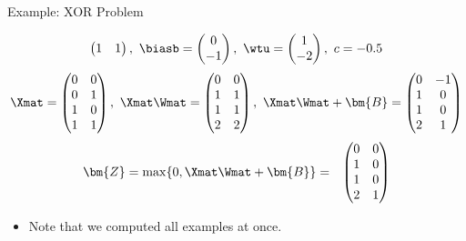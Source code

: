 \documentclass[11pt,compress,t,notes=noshow, xcolor=table]{beamer}
\begin{document}
\begin{vbframe}{Example: XOR Problem}
{\begin{eqnarray*}
\begin{pmatrix}
      1 & 1
    \end{pmatrix}, \
      \biasb = \begin{pmatrix}
      0 \\
      -1
    \end{pmatrix}, \
      \wtu = \begin{pmatrix}
      1 \\
      -2
    \end{pmatrix}, \
      c = - 0.5
  \end{eqnarray*}
  \begin{eqnarray*}
  \Xmat = \begin{pmatrix}
      0 & 0 \\
      0 & 1 \\
      1 & 0 \\
      1 & 1
    \end{pmatrix}, \
    \Xmat\Wmat = \begin{pmatrix}
      0 & 0 \\
      1 & 1 \\
      1 & 1 \\
      2 & 2
    \end{pmatrix}, \
      \Xmat \Wmat + \bm{B} = \begin{pmatrix}
        0 & -1 \\
        1 & 0 \\
        1 & 0 \\
        2 & 1
    \end{pmatrix}
  \end{eqnarray*}
  \begin{eqnarray*}
    \bm{Z} = \max\{0, \Xmat \Wmat+\bm{B}\}
    &=&
    \begin{pmatrix}
      0 & 0 \\
      1 & 0 \\
      1 & 0 \\
      2 & 1
    \end{pmatrix}
  \end{eqnarray*}
  \begin{itemize}
    \item Note that we computed all examples at once.
  \end{itemize}

}
\end{vbframe}
\end{document}
